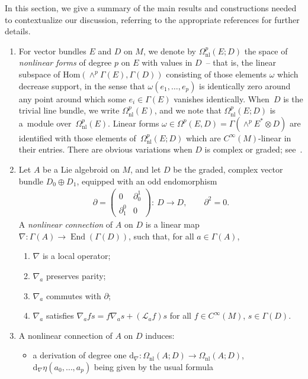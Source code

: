 \documentclass[11pt]{article}
\numberwithin{equation}{section}
\newcommand{\rmap}{\longrightarrow}
\newcommand{\bd}{\partial}
\newcommand{\dd}{\mathrm{d}}
\newcommand{\8}{\infty}
\begin{document}
In this section, we give a summary of the main results and constructions needed to contextualize our discussion, referring to the appropriate references for further details.
\begin{enumerate}\itemsep=0pt
 \item For vector bundles $E$ and $D$ on $M$, we denote by $\Omega^p_{\mathrm{nl}}(E;D)$ the space of \emph{nonlinear forms} of degree $p$ on $E$ with values in $D$~-- that is, the linear subspace of $\mathrm{Hom}(\wedge^p\Gamma(E),\Gamma(D))$ consisting of those elements $\omega$ which decrease support, in the sense that $\omega(e_1,\dots ,e_p)$ is identically zero around any point around which some $e_i \in \Gamma(E)$ vanishes identically. When~$D$ is the trivial line bundle, we write $\Omega^p_{\mathrm{nl}}(E)$, and we note that $\Omega^p_{\mathrm{nl}}(E;D)$ is a~module over~$\Omega^p_{\mathrm{nl}}(E)$. Linear forms $\omega \in \Omega^p(E,D)=\Gamma(\wedge^pE^* \otimes D)$ are identified with those elements of~$\Omega^p_{\mathrm{nl}}(E;D)$ which are $C^{\8}(M)$-linear in their entries. There are obvious variations when $D$ is complex or graded; see~\cite{AbadCrainic,CrainicNL}.
 \item Let $A$ be a Lie algebroid on $M$, and let $D$ be the graded, complex vector bundle $D_0 \oplus D_1$, equipped with an odd endomorphism
\begin{gather*}
 \bd = \left(\begin{matrix}
 0 & \bd^1_0 \\
 \bd^0_1 & 0
 \end{matrix}\right) \colon \ D \rmap D, \qquad \bd^2 = 0.
\end{gather*}A \emph{nonlinear connection} of $A$ on $D$ is a linear map $\nabla \colon \Gamma(A) \to \operatorname{End}(\Gamma(D))$, such that, for all $a \in \Gamma(A)$,
\begin{enumerate}\itemsep=0pt
\item[a)] $\nabla$ is a local operator;
 \item[b)] $\nabla_a$ preserves parity;
 \item[c)] $\nabla_a$ commutes with $\bd$;
 \item[d)] $\nabla_a$ satisfies $\nabla_a fs = f\nabla_as+ (\mathscr{L}_af)s$ for all $f \in C^{\8}(M)$, $s \in \Gamma(D)$.
\end{enumerate}
\item A nonlinear connection of $A$ on $D$ induces:
\begin{itemize}\itemsep=0pt
 \item a derivation of degree one $\dd_{\nabla}\colon \Omega_{\mathrm{nl}}(A;D) \to \Omega_{\mathrm{nl}}(A;D)$, $\dd_{\nabla}\eta(a_0,\dots ,a_p)$ being given by the usual formula

\end{itemize}
\end{enumerate}
\end{document}
